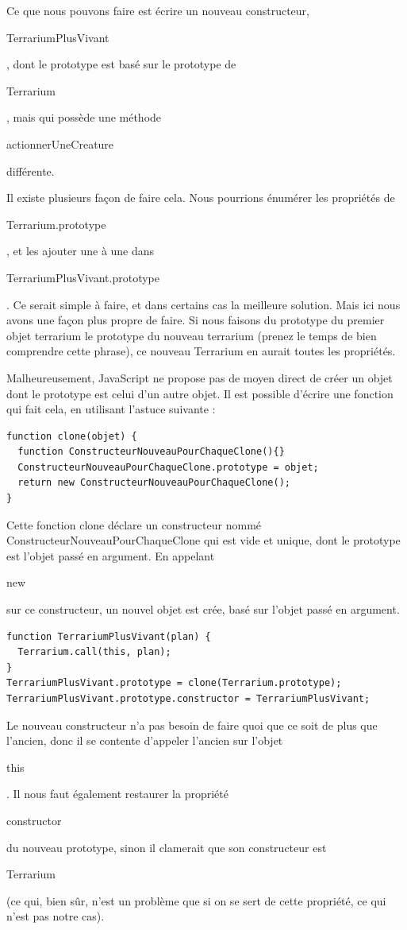 \documentclass{FramateX}
\renewcommand{\texttt}[1]{\begin{sffamily}{#1}\end{sffamily}}
\begin{document}
Ce que nous pouvons faire est écrire un nouveau constructeur,
\texttt{TerrariumPlusVivant}, dont le prototype est basé sur le
prototype de \texttt{Terrarium}, mais qui possède une méthode
\texttt{actionnerUneCreature} différente.

\begin{center}\end{center}

Il existe plusieurs façon de faire cela. Nous pourrions énumérer les
propriétés de \texttt{Terrarium.prototype}, et les ajouter une à une
dans \texttt{TerrariumPlusVivant.prototype}. Ce serait simple à faire,
et dans certains cas la meilleure solution. Mais ici nous avons une
façon plus propre de faire. Si nous faisons du prototype du premier
objet terrarium le prototype du nouveau terrarium (prenez le temps de
bien comprendre cette phrase), ce nouveau Terrarium en aurait toutes les
propriétés.

Malheureusement, JavaScript ne propose pas de moyen direct de créer un
objet dont le prototype est celui d'un autre objet. Il est possible
d'écrire une fonction qui fait cela, en utilisant l'astuce suivante :

\begin{lstlisting}
function clone(objet) {
  function ConstructeurNouveauPourChaqueClone(){}
  ConstructeurNouveauPourChaqueClone.prototype = objet;
  return new ConstructeurNouveauPourChaqueClone();
}
\end{lstlisting}
Cette fonction clone déclare un constructeur nommé
ConstructeurNouveauPourChaqueClone qui est vide et unique, dont le
prototype est l'objet passé en argument. En appelant \texttt{new} sur ce
constructeur, un nouvel objet est crée, basé sur l'objet passé en
argument.

\begin{lstlisting}
function TerrariumPlusVivant(plan) {
  Terrarium.call(this, plan);
}
TerrariumPlusVivant.prototype = clone(Terrarium.prototype);
TerrariumPlusVivant.prototype.constructor = TerrariumPlusVivant;
\end{lstlisting}
Le nouveau constructeur n'a pas besoin de faire quoi que ce soit de plus
que l'ancien, donc il se contente d'appeler l'ancien sur l'objet
\texttt{this}. Il nous faut également restaurer la propriété
\texttt{constructor} du nouveau prototype, sinon il clamerait que son
constructeur est \texttt{Terrarium} (ce qui, bien sûr, n'est un problème
que si on se sert de cette propriété, ce qui n'est pas notre cas).

\begin{center}\end{center}
\end{document}
